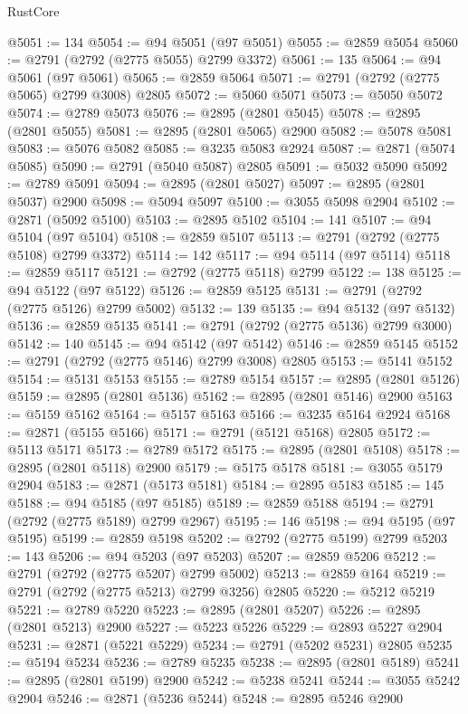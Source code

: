 \begin{lexlean}{RustCore}
\begin{coremodule}
@5051 := 134
@5054 := @94 @5051 (@97 @5051)
@5055 := @2859 @5054
@5060 := @2791 (@2792 (@2775 @5055) @2799 @3372)
@5061 := 135
@5064 := @94 @5061 (@97 @5061)
@5065 := @2859 @5064
@5071 := @2791 (@2792 (@2775 @5065) @2799 @3008) @2805
@5072 := @5060 @5071
@5073 := @5050 @5072
@5074 := @2789 @5073
@5076 := @2895 (@2801 @5045)
@5078 := @2895 (@2801 @5055)
@5081 := @2895 (@2801 @5065) @2900
@5082 := @5078 @5081
@5083 := @5076 @5082
@5085 := @3235 @5083 @2924
@5087 := @2871 (@5074 @5085)
@5090 := @2791 (@5040 @5087) @2805
@5091 := @5032 @5090
@5092 := @2789 @5091
@5094 := @2895 (@2801 @5027)
@5097 := @2895 (@2801 @5037) @2900
@5098 := @5094 @5097
@5100 := @3055 @5098 @2904
@5102 := @2871 (@5092 @5100)
@5103 := @2895 @5102
@5104 := 141
@5107 := @94 @5104 (@97 @5104)
@5108 := @2859 @5107
@5113 := @2791 (@2792 (@2775 @5108) @2799 @3372)
@5114 := 142
@5117 := @94 @5114 (@97 @5114)
@5118 := @2859 @5117
@5121 := @2792 (@2775 @5118) @2799
@5122 := 138
@5125 := @94 @5122 (@97 @5122)
@5126 := @2859 @5125
@5131 := @2791 (@2792 (@2775 @5126) @2799 @5002)
@5132 := 139
@5135 := @94 @5132 (@97 @5132)
@5136 := @2859 @5135
@5141 := @2791 (@2792 (@2775 @5136) @2799 @3000)
@5142 := 140
@5145 := @94 @5142 (@97 @5142)
@5146 := @2859 @5145
@5152 := @2791 (@2792 (@2775 @5146) @2799 @3008) @2805
@5153 := @5141 @5152
@5154 := @5131 @5153
@5155 := @2789 @5154
@5157 := @2895 (@2801 @5126)
@5159 := @2895 (@2801 @5136)
@5162 := @2895 (@2801 @5146) @2900
@5163 := @5159 @5162
@5164 := @5157 @5163
@5166 := @3235 @5164 @2924
@5168 := @2871 (@5155 @5166)
@5171 := @2791 (@5121 @5168) @2805
@5172 := @5113 @5171
@5173 := @2789 @5172
@5175 := @2895 (@2801 @5108)
@5178 := @2895 (@2801 @5118) @2900
@5179 := @5175 @5178
@5181 := @3055 @5179 @2904
@5183 := @2871 (@5173 @5181)
@5184 := @2895 @5183
@5185 := 145
@5188 := @94 @5185 (@97 @5185)
@5189 := @2859 @5188
@5194 := @2791 (@2792 (@2775 @5189) @2799 @2967)
@5195 := 146
@5198 := @94 @5195 (@97 @5195)
@5199 := @2859 @5198
@5202 := @2792 (@2775 @5199) @2799
@5203 := 143
@5206 := @94 @5203 (@97 @5203)
@5207 := @2859 @5206
@5212 := @2791 (@2792 (@2775 @5207) @2799 @5002)
@5213 := @2859 @164
@5219 := @2791 (@2792 (@2775 @5213) @2799 @3256) @2805
@5220 := @5212 @5219
@5221 := @2789 @5220
@5223 := @2895 (@2801 @5207)
@5226 := @2895 (@2801 @5213) @2900
@5227 := @5223 @5226
@5229 := @2893 @5227 @2904
@5231 := @2871 (@5221 @5229)
@5234 := @2791 (@5202 @5231) @2805
@5235 := @5194 @5234
@5236 := @2789 @5235
@5238 := @2895 (@2801 @5189)
@5241 := @2895 (@2801 @5199) @2900
@5242 := @5238 @5241
@5244 := @3055 @5242 @2904
@5246 := @2871 (@5236 @5244)
@5248 := @2895 @5246 @2900

\end{coremodule}
\end{lexlean}
